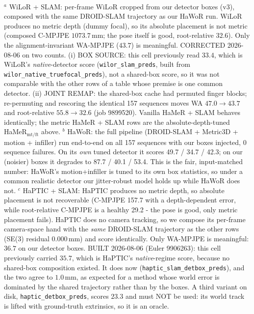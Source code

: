 \documentclass[border=5pt]{standalone}
\begin{document}
\begin{minipage}{17.4cm}
\begin{tabular}{@{}llcccc@{}}
\bottomrule
\end{tabular}\\[8pt]
\begin{minipage}{17.0cm}
\footnotesize
$^{a}$ WiLoR + SLAM: per-frame WiLoR cropped from our detector boxes (v3), composed with the same
DROID-SLAM trajectory as our HaWoR run. WiLoR produces no metric depth (dummy focal), so its
absolute placement is not metric (composed C-MPJPE $1073.7$\,mm; the pose itself is good,
root-relative $32.6$). Only the alignment-invariant WA-MPJPE ($43.7$) is meaningful.
CORRECTED 2026-08-06 on two counts. (i) BOX SOURCE: this cell previously read $33.4$, which is
WiLoR's \emph{native}-detector score (\texttt{wilor\_slam\_preds}, built from
\texttt{wilor\_native\_truefocal\_preds}), not a shared-box score, so it was not comparable with
the other rows of a table whose premise is one common detector. (ii) JOINT REMAP: the shared-box
cache had permuted finger blocks; re-permuting and rescoring the identical 157 sequences moves
WA $47.0 \to 43.7$ and root-relative $55.8 \to 32.6$ (job 9899520). Vanilla HaMeR + SLAM behaves
identically; the metric HaMeR + SLAM rows are the absolute-depth-tuned HaMeR$_{\text{mt/ft}}$ above.
$^{b}$ HaWoR: the full pipeline (DROID-SLAM + Metric3D + motion + infiller) run end-to-end on all 157
sequences with our boxes injected, 0 sequence failures. On its \emph{own} tuned detector it scores
49.7 / 34.7 / 42.3; on our (noisier) boxes it degrades to 87.7 / 40.1 / 53.4. This is the fair,
input-matched number: HaWoR's motion+infiller is tuned to its own box statistics, so under a common
realistic detector our jitter-robust model holds up while HaWoR does not.
$^{c}$ HaPTIC + SLAM: HaPTIC produces no metric depth, so absolute placement is not recoverable
(C-MPJPE 157.7 with a depth-dependent error, while root-relative C-MPJPE is a healthy 29.2 - the pose
is good, only metric placement fails). HaPTIC does no camera tracking, so we compose its per-frame
camera-space hand with the \emph{same} DROID-SLAM trajectory as the other rows (SE(3) residual
0.000\,mm) and score identically. Only WA-MPJPE is meaningful: $36.7$ on our detector boxes. BUILT 2026-08-06 (Euler 9906263): this cell previously carried $35.7$, which is HaPTIC's \emph{native}-regime score, because no shared-box composition existed. It does now (\texttt{haptic\_slam\_detbox\_preds}), and the two agree to $1.0$\,mm, as expected for a method whose world error is dominated by the shared trajectory rather than by the boxes. A third variant on disk, \texttt{haptic\_detbox\_preds}, scores $23.3$ and must NOT be used: its world track is lifted with ground-truth extrinsics, so it is an oracle.

\end{minipage}
\end{minipage}
\end{document}
